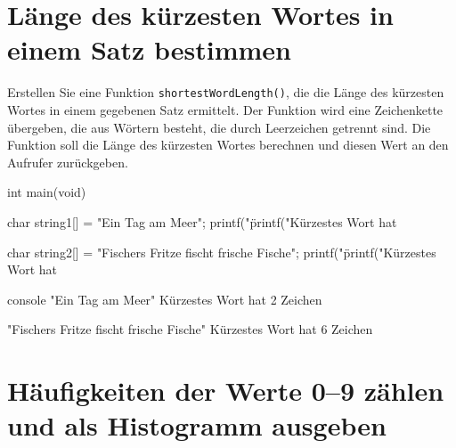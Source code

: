 \chapter{Länge des kürzesten Wortes in einem Satz bestimmen}

\vspace{10pt}

Erstellen Sie eine Funktion \texttt{shortestWordLength()}, die die Länge
des kürzesten Wortes in einem gegebenen Satz ermittelt. Der Funktion wird eine
Zeichenkette übergeben, die aus Wörtern besteht, die durch Leerzeichen getrennt
sind. Die Funktion soll die Länge des kürzesten Wortes berechnen und diesen Wert
an den Aufrufer zurückgeben.

\Vorlage
\begin{codebox}[lang=c, fontsize=\small]
int main(void) {
    char string1[] = "Ein Tag am Meer";
    printf("\"%
    printf("Kürzestes Wort hat %

    char string2[] = "Fischers Fritze fischt frische Fische";
    printf("\"%
    printf("Kürzestes Wort hat %
}
\end{codebox}

\begin{mybox}[Bildschirmausgabe]{console}
"Ein Tag am Meer"
Kürzestes Wort hat 2 Zeichen

"Fischers Fritze fischt frische Fische"
Kürzestes Wort hat 6 Zeichen
\end{mybox}




\chapter{Häufigkeiten der Werte 0--9 zählen und als Histogramm ausgeben}

\vspace{10pt}

